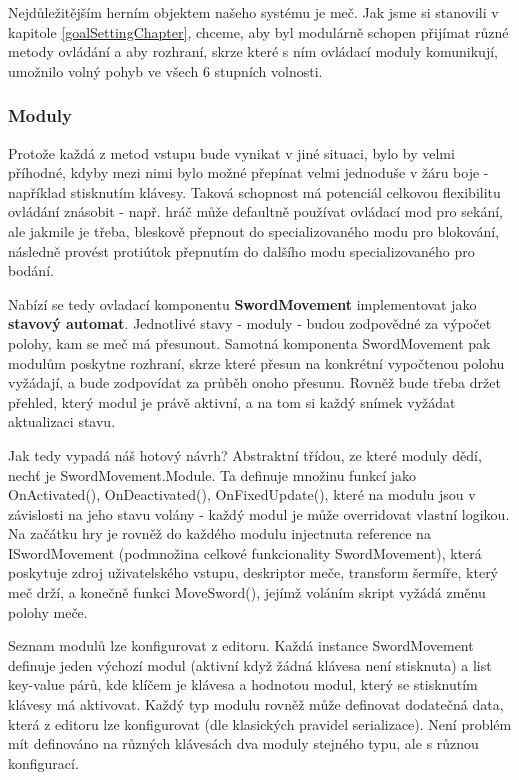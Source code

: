 Nejdůležitějším herním objektem našeho systému je meč. Jak jsme si stanovili v kapitole \ref{goalSettingChapter}, chceme, aby byl modulárně schopen přijímat různé metody ovládání a aby rozhraní, skrze které s ním ovládací moduly komunikují, umožnilo volný pohyb ve všech 6 stupních volnosti.

\subsubsection*{Moduly}

Protože každá z metod vstupu bude vynikat v jiné situaci, bylo by velmi příhodné, kdyby mezi nimi bylo možné přepínat velmi jednoduše v žáru boje - například stisknutím klávesy. Taková schopnost má potenciál celkovou flexibilitu ovládání znásobit - např. hráč může defaultně používat ovládací mod pro sekání, ale jakmile je třeba, bleskově přepnout do specializovaného modu pro blokování, následně provést protiútok přepnutím do dalšího modu specializovaného pro bodání. 

Nabízí se tedy ovladací komponentu \textbf{SwordMovement} implementovat jako \textbf{stavový automat}. Jednotlivé stavy - moduly - budou zodpovědné za výpočet polohy, kam se meč má přesunout. Samotná komponenta SwordMovement pak modulům poskytne rozhraní, skrze které přesun na konkrétní vypočtenou polohu vyžádají, a bude zodpovídat za průběh onoho přesunu. Rovněž bude třeba držet přehled, který modul je právě aktivní, a na tom si každý snímek vyžádat aktualizaci stavu.

Jak tedy vypadá náš hotový návrh? Abstraktní třídou, ze které moduly dědí, nechť je SwordMovement.Module. Ta definuje množinu funkcí jako OnActivated(), OnDeactivated(), OnFixedUpdate(), které na modulu jsou v závislosti na jeho stavu volány - každý modul je může overridovat vlastní logikou. Na začátku hry je rovněž do každého modulu injectnuta reference na ISwordMovement (podmnožina celkové funkcionality SwordMovement), která poskytuje zdroj uživatelského vstupu, deskriptor meče, transform šermíře, který meč drží, a konečně funkci MoveSword(), jejímž voláním skript vyžádá změnu polohy meče.

Seznam modulů lze konfigurovat z editoru. Každá instance SwordMovement definuje jeden výchozí modul (aktivní když žádná klávesa není stisknuta) a list key-value párů, kde klíčem je klávesa a hodnotou modul, který se stisknutím klávesy má aktivovat. Každý typ modulu rovněž může definovat dodatečná data, která z editoru lze konfigurovat (dle klasických pravidel serializace). Není problém mít definováno na různých klávesách dva moduly stejného typu, ale s různou konfigurací.

